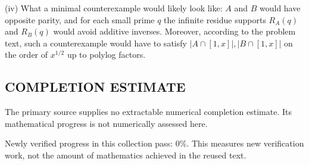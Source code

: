 (iv) What a minimal counterexample would likely look like: $A$ and $B$ would have opposite parity, and for each small prime $q$ the infinite residue supports $R_A(q)$ and $R_B(q)$ would avoid additive inverses. Moreover, according to the problem text, such a counterexample would have to satisfy $|A\cap[1,x]|,|B\cap[1,x]|$ on the order of $x^{1/2}$ up to polylog factors.




\subsection*{COMPLETION ESTIMATE}
The primary source supplies no extractable numerical completion estimate. Its mathematical progress is not numerically assessed here.

Newly verified progress in this collection pass: $0\%$. This measures new verification work, not the amount of mathematics achieved in the reused text.
